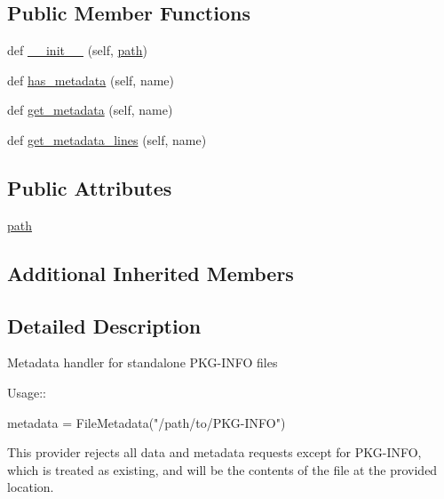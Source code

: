 \subsection*{Public Member Functions}
\begin{DoxyCompactItemize}
\item 
def \hyperlink{classpip_1_1__vendor_1_1pkg__resources_1_1FileMetadata_a586e00e32c97e1be39976fd487453be8}{\+\_\+\+\_\+init\+\_\+\+\_\+} (self, \hyperlink{classpip_1_1__vendor_1_1pkg__resources_1_1FileMetadata_ad6e7bd5eefb881a2a8a3f4d72ae4bb87}{path})
\item 
def \hyperlink{classpip_1_1__vendor_1_1pkg__resources_1_1FileMetadata_a8e1bf0170ef96d65a71be9cd2953f4fc}{has\+\_\+metadata} (self, name)
\item 
def \hyperlink{classpip_1_1__vendor_1_1pkg__resources_1_1FileMetadata_a16b779585d24edd6c220c3a2b91826f5}{get\+\_\+metadata} (self, name)
\item 
def \hyperlink{classpip_1_1__vendor_1_1pkg__resources_1_1FileMetadata_acfa8be19ceb50c3e43434e2cd3d14e3d}{get\+\_\+metadata\+\_\+lines} (self, name)
\end{DoxyCompactItemize}
\subsection*{Public Attributes}
\begin{DoxyCompactItemize}
\item 
\hyperlink{classpip_1_1__vendor_1_1pkg__resources_1_1FileMetadata_ad6e7bd5eefb881a2a8a3f4d72ae4bb87}{path}
\end{DoxyCompactItemize}
\subsection*{Additional Inherited Members}


\subsection{Detailed Description}
\begin{DoxyVerb}Metadata handler for standalone PKG-INFO files

Usage::

    metadata = FileMetadata("/path/to/PKG-INFO")

This provider rejects all data and metadata requests except for PKG-INFO,
which is treated as existing, and will be the contents of the file at
the provided location.
\end{DoxyVerb}
 

